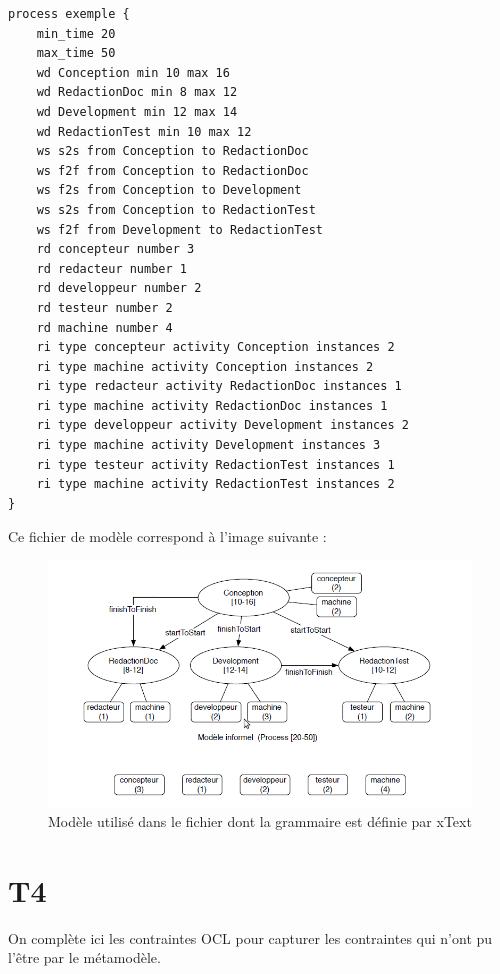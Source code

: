 \documentclass{report}
\begin{document}
\begin{verbatim}
process exemple {
	min_time 20
	max_time 50
	wd Conception min 10 max 16
	wd RedactionDoc min 8 max 12
	wd Development min 12 max 14
	wd RedactionTest min 10 max 12
	ws s2s from Conception to RedactionDoc
	ws f2f from Conception to RedactionDoc
	ws f2s from Conception to Development
	ws s2s from Conception to RedactionTest
	ws f2f from Development to RedactionTest
	rd concepteur number 3
	rd redacteur number 1
	rd developpeur number 2
	rd testeur number 2
	rd machine number 4
	ri type concepteur activity Conception instances 2
	ri type machine activity Conception instances 2
	ri type redacteur activity RedactionDoc instances 1
	ri type machine activity RedactionDoc instances 1
	ri type developpeur activity Development instances 2
	ri type machine activity Development instances 3
	ri type testeur activity RedactionTest instances 1
	ri type machine activity RedactionTest instances 2
}
\end{verbatim}

Ce fichier de modèle correspond à l'image suivante :\\

\begin{figure}[!h] 
\begin{center}
\includegraphics[width=15cm]{Capture-6.png}
\caption{Modèle utilisé dans le fichier dont la grammaire est définie par xText} 
\label{img1} 
\end{center}
\end{figure} 

\newpage

\section{T4}

On complète ici les contraintes OCL pour capturer les contraintes qui n’ont pu l’être par le métamodèle.
\end{document}
